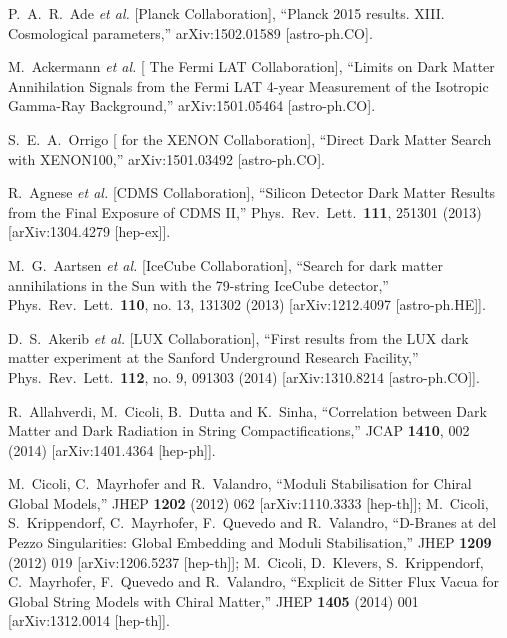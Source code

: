 \documentclass[11pt,a4paper]{article}
\begin{document}
\begin{thebibliography}{99}
P.~A.~R.~Ade {\it et al.}  [Planck Collaboration],
  ``Planck 2015 results. XIII. Cosmological parameters,''
  arXiv:1502.01589 [astro-ph.CO].
  
M.~Ackermann {\it et al.}  [ The Fermi LAT Collaboration],
  ``Limits on Dark Matter Annihilation Signals from the Fermi LAT 4-year Measurement of the Isotropic Gamma-Ray Background,''
  arXiv:1501.05464 [astro-ph.CO].

S.~E.~A.~Orrigo [ for the XENON Collaboration],
  ``Direct Dark Matter Search with XENON100,''
  arXiv:1501.03492 [astro-ph.CO].

R.~Agnese {\it et al.}  [CDMS Collaboration],
  ``Silicon Detector Dark Matter Results from the Final Exposure of CDMS II,''
  Phys.\ Rev.\ Lett.\  {\bf 111}, 251301 (2013)
  [arXiv:1304.4279 [hep-ex]].

  M.~G.~Aartsen {\it et al.}  [IceCube Collaboration],
  ``Search for dark matter annihilations in the Sun with the 79-string IceCube detector,''
  Phys.\ Rev.\ Lett.\  {\bf 110}, no. 13, 131302 (2013)
  [arXiv:1212.4097 [astro-ph.HE]].

D.~S.~Akerib {\it et al.}  [LUX Collaboration],
  ``First results from the LUX dark matter experiment at the Sanford Underground Research Facility,''
  Phys.\ Rev.\ Lett.\  {\bf 112}, no. 9, 091303 (2014)
  [arXiv:1310.8214 [astro-ph.CO]].

  R.~Allahverdi, M.~Cicoli, B.~Dutta and K.~Sinha,
  ``Correlation between Dark Matter and Dark Radiation in String Compactifications,''
  JCAP {\bf 1410}, 002 (2014)
  [arXiv:1401.4364 [hep-ph]].

M.~Cicoli, C.~Mayrhofer and R.~Valandro,
  ``Moduli Stabilisation for Chiral Global Models,''
  JHEP {\bf 1202} (2012) 062
  [arXiv:1110.3333 [hep-th]];
M.~Cicoli, S.~Krippendorf, C.~Mayrhofer, F.~Quevedo and R.~Valandro,
  ``D-Branes at del Pezzo Singularities: Global Embedding and Moduli Stabilisation,''
  JHEP {\bf 1209} (2012) 019
  [arXiv:1206.5237 [hep-th]];
M.~Cicoli, D.~Klevers, S.~Krippendorf, C.~Mayrhofer, F.~Quevedo and R.~Valandro,
  ``Explicit de Sitter Flux Vacua for Global String Models with Chiral Matter,''
  JHEP {\bf 1405} (2014) 001
  [arXiv:1312.0014 [hep-th]].


\end{thebibliography}
\end{document}
